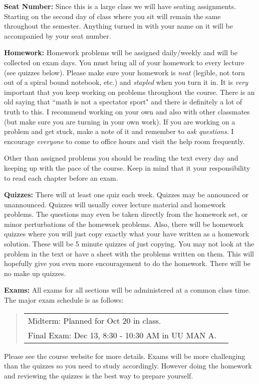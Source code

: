\documentclass[12pt]{article}
\begin{document}
{\bf Seat Number:}  Since this is a large class we will have seating assignments.  Starting on the second day of class where you sit will remain the same throughout the semester.  Anything turned in with your name on it will be accompanied by your seat number.

{\bf Homework:} Homework problems will be assigned daily/weekly and will be collected on exam days.  You must bring all of your homework to every lecture (see quizzes below).  Please make sure your homework is {\it neat} (legible, not torn out of a spiral bound notebook, etc.) and {\it stapled} when you turn it in.  It is {\it very} important that you keep working on problems throughout the course.  There is an old saying that ``math is not a spectator sport" and there is definitely a lot of truth to this.  I recommend working on your own and also with other classmates (but make sure you are turning in your own work).  If you are working on a problem and get stuck, make a note of it and remember to {\it ask questions}.  I encourage {\it everyone} to come to office hours and visit the help room frequently.

Other than assigned problems you should be reading the text every day and keeping up with the pace of the course.  Keep in mind that it your responsibility to read each chapter before an exam.

{\bf Quizzes:} There will at least one quiz each week.  Quizzes may be announced or unannounced.  Quizzes will usually cover lecture material and homework problems.  The questions may even be taken directly from the homework set, or minor perturbations of the homework problems.  Also, there will be homework quizzes where you will just copy exactly what your have written as a homework solution.  These will be 5 minute quizzes of just copying.  You may not look at the problem in the text or have a sheet with the problems written on them.  This will hopefully give you even more encouragement to do the homework.   There will be no make up quizzes.  %


{\bf Exams:} All exams for all sections will be administered at a common class time.  The major exam schedule is as follows:
\begin{quote}
\begin{center}
\begin{tabular}{lr}
Midterm: Planned for Oct 20 in class.\\
Final Exam: Dec 13, 8:30 - 10:30 AM in UU MAN A.
\end{tabular}
\end{center}
\end{quote}
Please see the course website for more details.  Exams will be more challenging than the quizzes so you need to study accordingly.  However doing the homework and reviewing the quizzes is the best way to prepare yourself.  %
\end{document}
